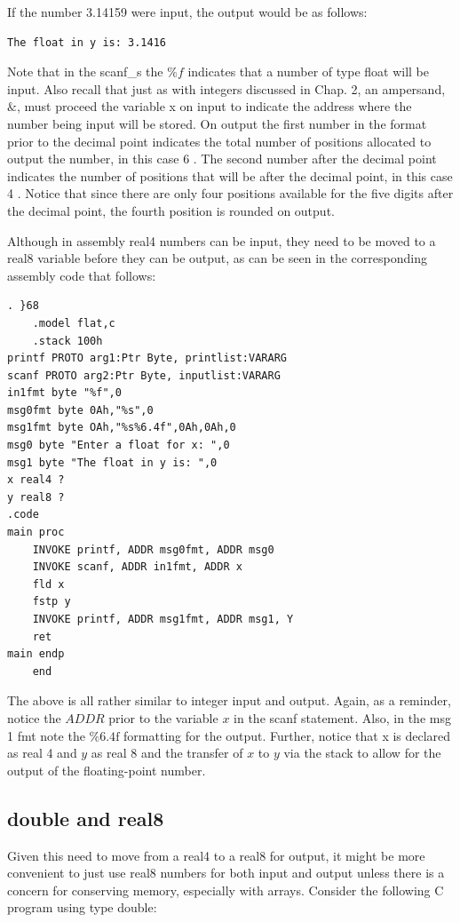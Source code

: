\documentclass[10pt]{book}
\begin{document}
If the number 3.14159 were input, the output would be as follows:

\begin{verbatim}
The float in y is: 3.1416
\end{verbatim}

Note that in the scanf\_s the $\% f$ indicates that a number of type float will be input. Also recall that just as with integers discussed in Chap. 2, an ampersand, $\&$, must proceed the variable x on input to indicate the address where the number being input will be stored. On output the first number in the format prior to the decimal point indicates the total number of positions allocated to output the number, in this case 6 . The second number after the decimal point indicates the number of positions that will be after the decimal point, in this case 4 . Notice that since there are only four positions available for the five digits after the decimal point, the fourth position is rounded on output.

Although in assembly real4 numbers can be input, they need to be moved to a real8 variable before they can be output, as can be seen in the corresponding assembly code that follows:

\begin{verbatim}
. }68
    .model flat,c
    .stack 100h
printf PROTO arg1:Ptr Byte, printlist:VARARG
scanf PROTO arg2:Ptr Byte, inputlist:VARARG
in1fmt byte "%f",0
msg0fmt byte 0Ah,"%s",0
msg1fmt byte OAh,"%s%6.4f",0Ah,0Ah,0
msg0 byte "Enter a float for x: ",0
msg1 byte "The float in y is: ",0
x real4 ?
y real8 ?
.code
main proc
    INVOKE printf, ADDR msg0fmt, ADDR msg0
    INVOKE scanf, ADDR in1fmt, ADDR x
    fld x
    fstp y
    INVOKE printf, ADDR msg1fmt, ADDR msg1, Y
    ret
main endp
    end
\end{verbatim}

The above is all rather similar to integer input and output. Again, as a reminder, notice the $A D D R$ prior to the variable $x$ in the scanf statement. Also, in the msg 1 fmt note the $\% 6.4 \mathrm{f}$ formatting for the output. Further, notice that x is declared as real 4 and $y$ as real 8 and the transfer of $x$ to $y$ via the stack to allow for the output of the floating-point number.


\subsection{double and real8}
Given this need to move from a real4 to a real8 for output, it might be more convenient to just use real8 numbers for both input and output unless there is a concern for conserving memory, especially with arrays. Consider the following C program using type double:
\end{document}
